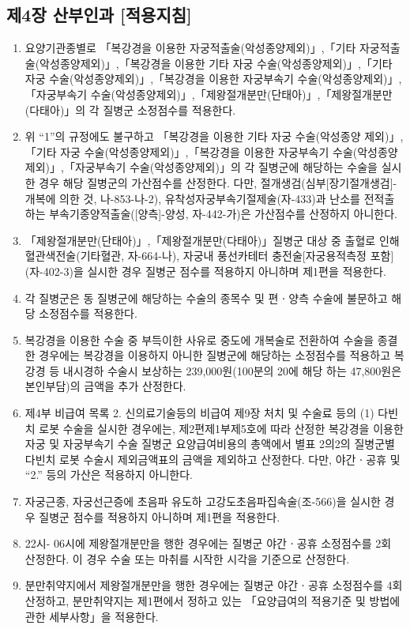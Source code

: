 \clearpage
\subsection{제4장 산부인과 [적용지침]}
\begin{enumerate}[1.]\tightlist
\item 요양기관종별로 「복강경을 이용한 자궁적출술(악성종양제외)」,「기타 자궁적출술(악성종양제외)」,「복강경을 이용한 기타 자궁 수술(악성종양제외)」,「기타 자궁 수술(악성종양제외)」,「복강경을 이용한 자궁부속기 수술(악성종양제외)」,「자궁부속기 수술(악성종양제외)」,「제왕절개분만(단태아)」,「제왕절개분만(다태아)」의 각 질병군 소정점수를 적용한다.
\item 위 “1”의 규정에도 불구하고 「복강경을 이용한 기타 자궁 수술(악성종양 제외)」,「기타 자궁 수술(악성종양제외)」,「복강경을 이용한 자궁부속기 수술(악성종양제외)」,「자궁부속기 수술(악성종양제외)」의 각 질병군에 해당하는 수술을 실시한 경우 해당 질병군의 가산점수를 산정한다. 다만, 절개생검(심부[장기절개생검]-개복에 의한 것, 나-853-나-2), 유착성자궁부속기절제술(자-433)과 난소를 전적출하는 부속기종양적출술([양측]-양성, 자-442-가)은 가산점수를 산정하지 아니한다.
\item 「제왕절개분만(단태아)」,「제왕절개분만(다태아)」질병군 대상 중 출혈로 인해 혈관색전술(기타혈관, 자-664-나), 자궁내 풍선카테터 충전술[자궁용적측정 포함](자-402-3)을 실시한 경우 질병군 점수를 적용하지 아니하며 제1편을 적용한다.
\item 각 질병군은 동 질병군에 해당하는 수술의 종목수 및 편ㆍ양측 수술에 불문하고 해당 소정점수를 적용한다.
\item 복강경을 이용한 수술 중 부득이한 사유로 중도에 개복술로 전환하여 수술을 종결한 경우에는 복강경을 이용하지 아니한 질병군에 해당하는 소정점수를 적용하고 복강경 등 내시경하 수술시 보상하는 239,000원(100분의 20에 해당 하는 47,800원은 본인부담)의 금액을 추가 산정한다.
\item 제4부 비급여 목록 2. 신의료기술등의 비급여 제9장 처치 및 수술료 등의 (1) 다빈치 로봇 수술을 실시한 경우에는, 제2편제1부제5호에 따라 산정한 복강경을 이용한 자궁 및 자궁부속기 수술 질병군 요양급여비용의 총액에서 별표 2의2의 질병군별 다빈치 로봇 수술시 제외금액표의 금액을 제외하고 산정한다. 다만, 야간ㆍ공휴 및 “2.” 등의 가산은 적용하지 아니한다.
\item 자궁근종, 자궁선근증에 초음파 유도하 고강도초음파집속술(조-566)을 실시한 경우 질병군 점수를 적용하지 아니하며 제1편을 적용한다.
\item 22시- 06시에 제왕절개분만을 행한 경우에는 질병군 야간ㆍ공휴 소정점수를 2회 산정한다. 이 경우 수술 또는 마취를 시작한 시각을 기준으로 산정한다.
\item 분만취약지에서 제왕절개분만을 행한 경우에는 질병군 야간ㆍ공휴 소정점수를 4회 산정하고, 분만취약지는 제1편에서 정하고 있는 「요양급여의 적용기준 및 방법에 관한 세부사항」을 적용한다.
\end{enumerate}

